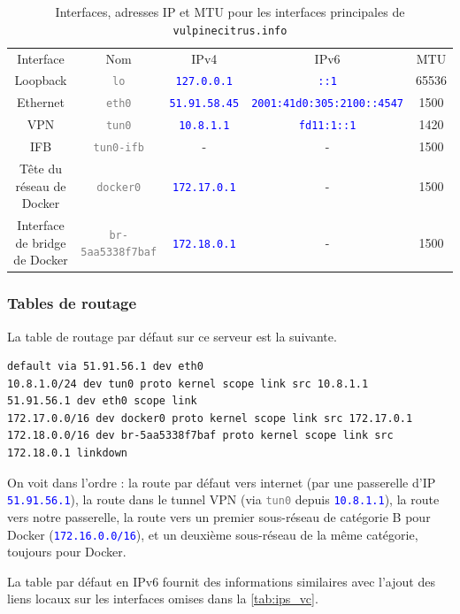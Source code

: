 \documentclass[a4paper,10pt]{article}
\newcommand{\codeword}[1]{\texttt{\textcolor{gray}{#1}}}
\newcommand{\blueword}[1]{\texttt{\textcolor{blue}{#1}}}
\begin{document}
\begin{table}[ht]
\centering
\begin{tabular}{|c|c|c|c|c|}
\bottomrule
Interface & Nom & IPv4 & IPv6 & MTU\\
Loopback & \codeword{lo} & \blueword{127.0.0.1} & \blueword{::1} & 65536\\
Ethernet & \codeword{eth0} & \blueword{51.91.58.45} & \blueword{2001:41d0:305:2100::4547} & 1500\\
VPN & \codeword{tun0} & \blueword{10.8.1.1} & \blueword{fd11:1::1} & 1420\\
IFB & \codeword{tun0-ifb} & - & - & 1500\\
Tête du réseau de Docker & \codeword{docker0} & \blueword{172.17.0.1} & - & 1500\\
Interface de bridge de Docker & \codeword{br-5aa5338f7baf} & \blueword{172.18.0.1} & - & 1500\\\toprule
\end{tabular}
\caption{Interfaces, adresses IP et MTU pour les interfaces principales de \texttt{vulpinecitrus.info}}
\label{tab:ips_vc}
\end{table}

\subsubsection{Tables de routage}

La table de routage par défaut sur ce serveur est la suivante.

\begin{lstlisting}[basicstyle=\small]
default via 51.91.56.1 dev eth0 
10.8.1.0/24 dev tun0 proto kernel scope link src 10.8.1.1 
51.91.56.1 dev eth0 scope link 
172.17.0.0/16 dev docker0 proto kernel scope link src 172.17.0.1
172.18.0.0/16 dev br-5aa5338f7baf proto kernel scope link src 172.18.0.1 linkdown
\end{lstlisting}

On voit dans l'ordre : la route par défaut vers internet (par une passerelle d'IP \blueword{51.91.56.1}), la route dans le tunnel VPN (via \codeword{tun0} depuis \blueword{10.8.1.1}), la route vers notre passerelle, la route vers un premier sous-réseau de catégorie B pour Docker (\blueword{172.16.0.0/16}), et un deuxième sous-réseau de la même catégorie, toujours pour Docker.

La table par défaut en IPv6 fournit des informations similaires avec l'ajout des liens locaux sur les interfaces omises dans la \autoref{tab:ips_vc}.
\end{document}
